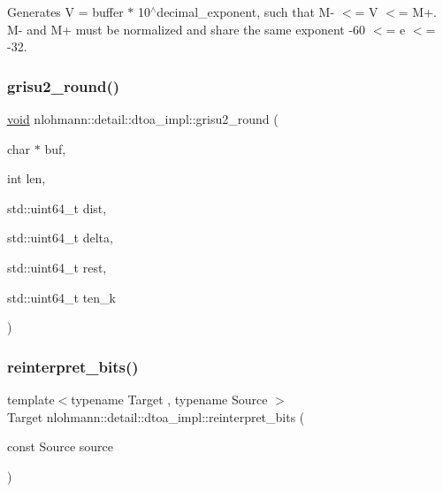 Generates V = buffer $\ast$ 10$^\wedge$decimal\+\_\+exponent, such that M-\/ $<$= V $<$= M+. M-\/ and M+ must be normalized and share the same exponent -\/60 $<$= e $<$= -\/32. \mbox{\label{namespacenlohmann_1_1detail_1_1dtoa__impl_a5bc841e0bee12fd6489d49cf7bd07bb4}} 
\subsubsection{\texorpdfstring{grisu2\+\_\+round()}{grisu2\_round()}}
{\footnotesize\ttfamily \hyperlink{namespacenlohmann_1_1detail_a59fca69799f6b9e366710cb9043aa77d}{void} nlohmann\+::detail\+::dtoa\+\_\+impl\+::grisu2\+\_\+round (\begin{DoxyParamCaption}\item[{char $\ast$}]{buf,  }\item[{int}]{len,  }\item[{std\+::uint64\+\_\+t}]{dist,  }\item[{std\+::uint64\+\_\+t}]{delta,  }\item[{std\+::uint64\+\_\+t}]{rest,  }\item[{std\+::uint64\+\_\+t}]{ten\+\_\+k }\end{DoxyParamCaption})\hspace{0.3cm}{\ttfamily [inline]}}

\mbox{\label{namespacenlohmann_1_1detail_1_1dtoa__impl_a1c5d30eb51e5e994a3f48bde104d2ce8}} 
\subsubsection{\texorpdfstring{reinterpret\+\_\+bits()}{reinterpret\_bits()}}
{\footnotesize\ttfamily template$<$typename Target , typename Source $>$ \\
Target nlohmann\+::detail\+::dtoa\+\_\+impl\+::reinterpret\+\_\+bits (\begin{DoxyParamCaption}\item[{const Source}]{source }\end{DoxyParamCaption})}



